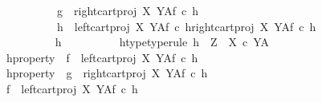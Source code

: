 \begin{isabellebody}
\ \ \ \ \ \ \ \ \ \ g\ {\isacharequal}{\kern0pt}\ right{\isacharunderscore}{\kern0pt}cart{\isacharunderscore}{\kern0pt}proj\ X\ Y\isactrlbsup A\isactrlesup \isactrlsub f\ {\isasymcirc}\isactrlsub c\ h{}\ {\isasymLongrightarrow}\isanewline
\ \ \ \ \ \ \ \ \ \ h{}\ {\isacharequal}{\kern0pt}\ {\isasymlangle}{\isacharparenleft}{\kern0pt}left{\isacharunderscore}{\kern0pt}cart{\isacharunderscore}{\kern0pt}proj\ X\ Y\isactrlbsup A\isactrlesup \isactrlsub f\ {\isasymcirc}\isactrlsub c\ h{}{\isacharparenright}{\kern0pt}\isactrlsup {\isasymflat}{\isacharcomma}{\kern0pt}{\isacharparenleft}{\kern0pt}right{\isacharunderscore}{\kern0pt}cart{\isacharunderscore}{\kern0pt}proj\ X\ Y\isactrlbsup A\isactrlesup \isactrlsub f\ {\isasymcirc}\isactrlsub c\ h{}{\isacharparenright}{\kern0pt}\isactrlsup {\isasymflat}{\isasymrangle}\isactrlsup {\isasymsharp}{\isachardoublequoteclose}\isanewline
\ \ \ \ \ \ \isamarkupfalse%
\ {\isacharminus}{\kern0pt}\isanewline
\ \ \ \ \ \ \ \ \isamarkupfalse%
\ h\isanewline
\ \ \ \ \ \ \ \ \isamarkupfalse%
\ h{\isacharunderscore}{\kern0pt}type{\isacharbrackleft}{\kern0pt}type{\isacharunderscore}{\kern0pt}rule{\isacharbrackright}{\kern0pt}{\isacharcolon}{\kern0pt}\ {\isachardoublequoteopen}h\ {\isacharcolon}{\kern0pt}\ Z\ {\isasymrightarrow}\ {\isacharparenleft}{\kern0pt}X\ {\isasymtimes}\isactrlsub c\ Y{\isacharparenright}{\kern0pt}\isactrlbsup A\isactrlesup {\isachardoublequoteclose}\isanewline
\ \ \ \ \ \ \ \ \isamarkupfalse%
\ h{\isacharunderscore}{\kern0pt}property{}{\isacharcolon}{\kern0pt}\ \ {\isachardoublequoteopen}f\ {\isacharequal}{\kern0pt}\ {\isacharparenleft}{\kern0pt}{\isacharparenleft}{\kern0pt}left{\isacharunderscore}{\kern0pt}cart{\isacharunderscore}{\kern0pt}proj\ X\ Y{\isacharparenright}{\kern0pt}\isactrlbsup A\isactrlesup \isactrlsub f{\isacharparenright}{\kern0pt}\ {\isasymcirc}\isactrlsub c\ h{\isachardoublequoteclose}\isanewline
\ \ \ \ \ \ \ \ \isamarkupfalse%
\ h{\isacharunderscore}{\kern0pt}property{}{\isacharcolon}{\kern0pt}\ \ {\isachardoublequoteopen}g\ {\isacharequal}{\kern0pt}\ {\isacharparenleft}{\kern0pt}{\isacharparenleft}{\kern0pt}right{\isacharunderscore}{\kern0pt}cart{\isacharunderscore}{\kern0pt}proj\ X\ Y{\isacharparenright}{\kern0pt}\isactrlbsup A\isactrlesup \isactrlsub f{\isacharparenright}{\kern0pt}\ {\isasymcirc}\isactrlsub c\ h{\isachardoublequoteclose}\isanewline
\ \ \ \ \isanewline
\ \ \ \ \ \ \ \ \isamarkupfalse%
\ {\isachardoublequoteopen}f\ {\isacharequal}{\kern0pt}\ {\isacharparenleft}{\kern0pt}left{\isacharunderscore}{\kern0pt}cart{\isacharunderscore}{\kern0pt}proj\ X\ Y{\isacharparenright}{\kern0pt}\isactrlbsup A\isactrlesup \isactrlsub f\ {\isasymcirc}\isactrlsub c\ h\isactrlsup {\isasymflat}\isactrlsup {\isasymsharp}{\isachardoublequoteclose}\isanewline

\end{isabellebody}

